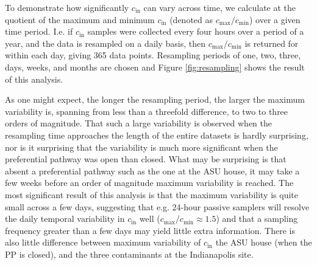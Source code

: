 \documentclass[journal=esthag,manuscript=article]{achemso}
\begin{document}
To demonstrate how significantly $c_\mathrm{in}$ can vary across time, we calculate at the quotient of the maximum and minimum $c_\mathrm{in}$ (denoted as $c_\mathrm{max}/c_\mathrm{min}$) over a given time period.
I.e. if $c_\mathrm{in}$ samples were collected every four hours over a period of a year, and the data is resampled on a daily basis, then $c_\mathrm{max}/c_\mathrm{min}$ is returned for within each day, giving 365 data points.
Resampling periods of one, two, three, days, weeks, and months are chosen and Figure \ref{fig:resampling} shows the result of this analysis.

As one might expect, the longer the resampling period, the larger the maximum variability is, spanning from less than a threefold difference, to two to three orders of magnitude.
That such a large variability is observed when the resampling time approaches the length of the entire datasets is hardly surprising, nor is it surprising that the variability is much more significant when the preferential pathway was open than closed.
What may be surprising is that absent a preferential pathway such as the one at the ASU house, it may take a few weeks before an order of magnitude maximum variability is reached.
The most significant result of this analysis is that the maximum variability is quite small across a few days, suggesting that e.g. 24-hour passive samplers will resolve the daily temporal variability in $c_\mathrm{in}$ well ($c_\mathrm{max}/c_\mathrm{min} \approx 1.5$) and that a sampling frequency greater than a few days may yield little extra information.
There is also little difference between maximum variability of $c_\mathrm{in}$ the ASU house (when the PP is closed), and the three contaminants at the Indianapolis site.


\end{document}
